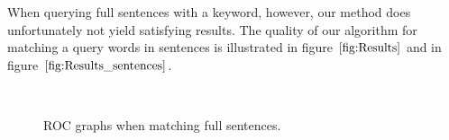 \documentclass[conference]{IEEEtran}
\begin{document}
When querying full sentences with a keyword, however, 
our method does unfortunately not yield satisfying results. The quality of our algorithm for matching a query words in sentences is illustrated in figure $\ref{fig:Results}$ and in figure $\ref{fig:Results_sentences}$.
\begin{figure}[ht!]%
\centering
{}
\\
\caption{ROC graphs when matching full sentences.}
\label{fig:Results}
\end{figure}
\end{document}

